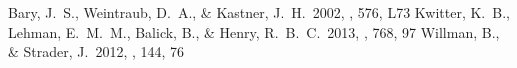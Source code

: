 \documentclass{knac}
\begin{document}
\begin{thebibliography}{}


 Bary, J.~S., Weintraub, D.~A., \& Kastner, J.~H.\ 2002,  \apjl, 576, L73 
 Kwitter, K.~B., Lehman,  E.~M.~M., Balick, B., \& Henry, R.~B.~C.\ 2013, \apj, 768, 97 
 Willman, B., \& Strader, J.\ 2012, \aj, 144, 76 
\end{thebibliography}

%
%
\end{document}
